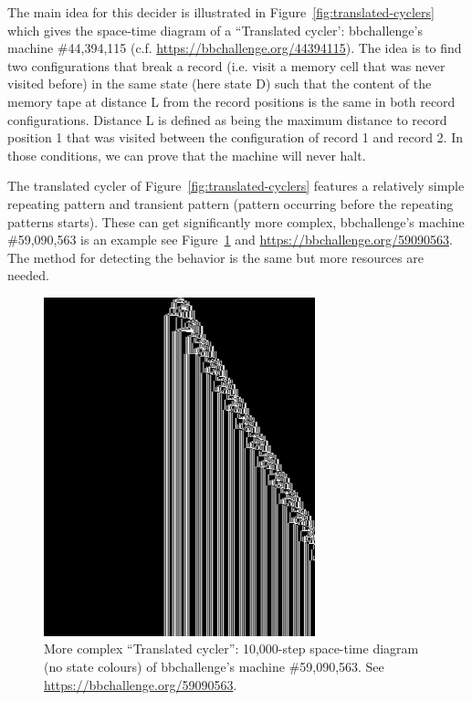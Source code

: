 The main idea for this decider is illustrated in Figure~\ref{fig:translated-cyclers} which gives the space-time diagram of a ``Translated cycler': bbchallenge's machine \#44,394,115 (c.f. \url{https://bbchallenge.org/44394115}). The idea is to find two configurations that break a record (i.e. visit a memory cell that was never visited before) in the same state (here state \textcolor{colorD}{D}) such that the content of the memory tape at distance L from the record positions is the same in both record configurations. Distance L is defined as being the maximum distance to record position 1 that was visited between the configuration of record 1 and record 2. In those conditions, we can prove that the machine will never halt.

The translated cycler of Figure~\ref{fig:translated-cyclers} features a relatively simple repeating pattern and transient pattern (pattern occurring before the repeating patterns starts). These can get significantly more complex, bbchallenge's machine \#59,090,563 is an example see Figure~\ref{fig:translated-cyclers-more} and \url{https://bbchallenge.org/59090563}. The method for detecting the behavior is the same but more resources are needed.


\begin{figure}
  \centering
  \includegraphics[width=0.7\textwidth]{figures/space-time-diagrams/translated_cycler_59090563.png}

  \caption{More complex ``Translated cycler'': 10,000-step space-time diagram (no state colours) of bbchallenge's machine \#59,090,563. See \url{https://bbchallenge.org/59090563}.}\label{fig:translated-cyclers-more}
\end{figure}


